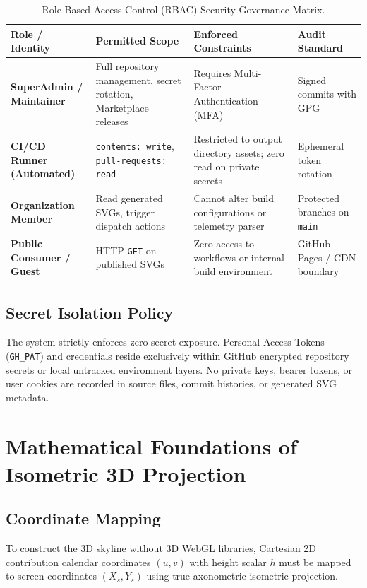 \documentclass[12pt,a4paper]{report}
\begin{document}
\begin{table}[htbp]
\centering
\small
\begin{tabularx}{\textwidth}{>{\raggedright\arraybackslash\bfseries}p{3.0cm}>{\raggedright\arraybackslash}X>{\raggedright\arraybackslash}X>{\raggedright\arraybackslash}p{2.6cm}}
\toprule
Role / Identity & Permitted Scope & Enforced Constraints & Audit Standard \\
\midrule
SuperAdmin / Maintainer & Full repository management, secret rotation, Marketplace releases & Requires Multi-Factor Authentication (MFA) & Signed commits with GPG \\
\addlinespace
CI/CD Runner (Automated) & \texttt{contents: write}, \texttt{pull-requests: read} & Restricted to output directory assets; zero read on private secrets & Ephemeral token rotation \\
\addlinespace
Organization Member & Read generated SVGs, trigger dispatch actions & Cannot alter build configurations or telemetry parser & Protected branches on \texttt{main} \\
\addlinespace
Public Consumer / Guest & HTTP \texttt{GET} on published SVGs & Zero access to workflows or internal build environment & GitHub Pages / CDN boundary \\
\bottomrule
\end{tabularx}
\caption{Role-Based Access Control (RBAC) Security Governance Matrix.}
\label{tab:rbac}
\end{table}

\section{Secret Isolation Policy}
The system strictly enforces zero-secret exposure. Personal Access Tokens (\texttt{GH\_PAT}) and credentials reside exclusively within GitHub encrypted repository secrets or local untracked environment layers. No private keys, bearer tokens, or user cookies are recorded in source files, commit histories, or generated SVG metadata.

\chapter{Mathematical Foundations of Isometric 3D Projection}

\section{Coordinate Mapping}
To construct the 3D skyline without 3D WebGL libraries, Cartesian 2D contribution calendar coordinates $(u, v)$ with height scalar $h$ must be mapped to screen coordinates $(X_s, Y_s)$ using true axonometric isometric projection.
\end{document}
